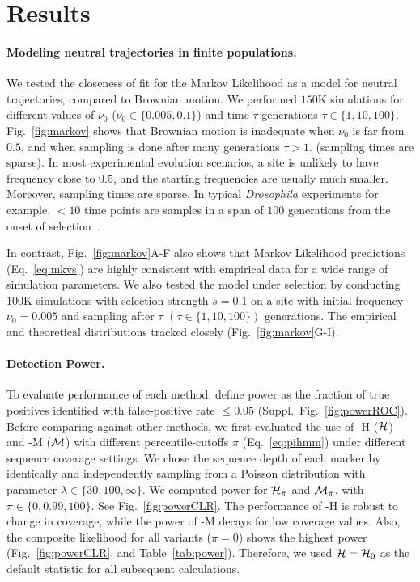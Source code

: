 \section{Results}
\paragraph{Modeling neutral trajectories in finite populations.} 
We tested the closeness of fit for the Markov Likelihood as a model
for neutral trajectories, compared to Brownian motion. We performed
$150$K simulations for different values of $\nu_0$
($\nu_0\in\{0.005,0.1\}$) and time $\tau$ generations $\tau\in
\{1,10,100\}$.  Fig.~\ref{fig:markov} shows that Brownian motion is
inadequate when $\nu_0$ is far from $0.5$, and when sampling is done
after many generations $\tau>1$. (sampling times are sparse). In most
experimental evolution scenarios, a site is unlikely to have frequency
close to $0.5$, and the starting frequencies are usually much
smaller. Moreover, sampling times are sparse. In typical
\emph{Drosophila} experiments for example, $<10$ time points are
samples in a span of $100$ generations from the onset of
selection~\cite{orozco2012adaptation, zhou2011experimental}.

In contrast, Fig.~\ref{fig:markov}A-F also shows that Markov
Likelihood predictions (Eq.~\ref{eq:mkvs}) are highly consistent with
empirical data for a wide range of simulation parameters. We also
tested the model under selection by conducting $100$K simulations with
selection strength $s=0.1$ on a site with initial frequency
$\nu_0=0.005$ and sampling after $\tau$ $(\tau\in\{1,10,100\})$
generations. The empirical and theoretical distributions tracked
closely (Fig.~\ref{fig:markov}G-I).

\paragraph{Detection Power.} 
To evaluate performance of each method, define power as the fraction
of true positives identified with false-positive rate $\le 0.05$
(Suppl.~Fig.~\ref{fig:powerROC}). Before comparing against other
methods, we first evaluated the use of \comale-H (${\cal H}$) and \comale-M
(${\cal M}$) with different percentile-cutoffs $\pi$ (Eq.~\ref{eq:pihmm})
under different sequence coverage settings. We chose the sequence
depth of each marker by identically and independently sampling from a
Poisson distribution with parameter $\lambda\in \{30,100,\infty\}$. We
computed power for ${\cal H}_\pi$ and ${\cal M}_{\pi}$, with $\pi \in
\{0,0.99,100\}$. See Fig.~\ref{fig:powerCLR}. The performance of
\comale-H is robust to change in coverage, while the power of
\comale-M decays for low coverage values. Also, the composite
likelihood for all variants ($\pi=0$) shows the highest power
(Fig.~\ref{fig:powerCLR}, and Table~\ref{tab:power}).  Therefore, we
used ${\cal H} = {\cal H}_0$ as the default statistic for all
subsequent calculations.

